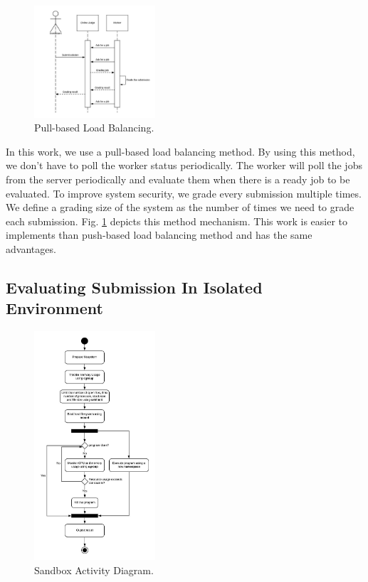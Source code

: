 \documentclass[conference]{IEEEtran}
\begin{document}
\begin{figure}[htbp]
\centerline{\includegraphics[width=0.4\textwidth]{images/paper-pull-based-load-balancing.jpeg}}
\caption{Pull-based Load Balancing.}
\label{pull-based-load-balancing}
\end{figure}

In this work, we use a pull-based load balancing method. By using this method, we don't have to poll the worker status periodically. The worker will poll the jobs from the server periodically and evaluate them when there is a ready job to be evaluated. To improve system security, we grade every submission multiple times. We define a grading size of the system as the number of times we need to grade each submission. Fig. \ref{pull-based-load-balancing} depicts this method mechanism. This work is easier to implements than push-based load balancing method and has the same advantages.

\subsection{Evaluating Submission In Isolated Environment}

\begin{figure}[htbp]
\centerline{\includegraphics[width=0.4\textwidth]{images/paper-sandbox-activity.jpeg}}
\caption{Sandbox Activity Diagram.}
\label{paper-sandbox-activity}
\end{figure}
\end{document}

